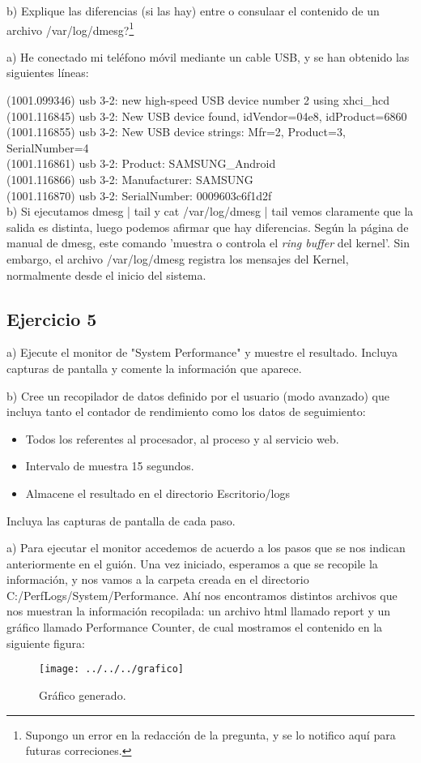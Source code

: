 \documentclass[a4paper, 11pt]{article} %
\begin{document}
b) Explique las diferencias (si las hay) entre o consulaar el contenido de un archivo /var/log/dmesg?\footnote{Supongo un error en la redacción de la pregunta, y se lo notifico aquí para futuras correciones.}


a) He conectado mi teléfono móvil mediante un cable USB, y se han obtenido las siguientes líneas: 

(1001.099346) usb 3-2: new high-speed USB device number 2 using xhci\_hcd\\
(1001.116845) usb 3-2: New USB device found, idVendor=04e8, idProduct=6860\\
(1001.116855) usb 3-2: New USB device strings: Mfr=2, Product=3, SerialNumber=4\\
(1001.116861) usb 3-2: Product: SAMSUNG\_Android\\
(1001.116866) usb 3-2: Manufacturer: SAMSUNG\\
(1001.116870) usb 3-2: SerialNumber: 0009603c6f1d2f\\


b) Si ejecutamos dmesg | tail y cat /var/log/dmesg | tail vemos claramente que la salida es distinta, luego podemos afirmar que hay diferencias. Según la página de manual de dmesg, este comando 'muestra o controla el \textit{ring buffer} del kernel'. Sin embargo, el archivo /var/log/dmesg registra los mensajes del Kernel, normalmente desde el inicio del sistema.

\subsection{Ejercicio 5}
a) Ejecute el monitor de "System Performance" y muestre el resultado. Incluya capturas de pantalla y comente la información que aparece. 

b) Cree un recopilador de datos definido por el usuario (modo avanzado) que incluya tanto el contador de rendimiento como los datos de seguimiento: 
\begin{itemize}
\item Todos los referentes al procesador, al proceso y al servicio web. 
\item Intervalo de muestra 15 segundos.
\item Almacene el resultado en el directorio Escritorio/logs
\end{itemize}
Incluya las capturas de pantalla de cada paso. 

a) Para ejecutar el monitor accedemos de acuerdo a los pasos que se nos indican anteriormente en el guión. Una vez iniciado, esperamos a que se recopile la información, y nos vamos a la carpeta creada en el directorio C:/PerfLogs/System/Performance. Ahí nos encontramos distintos archivos que nos muestran la información recopilada: un archivo html llamado report y un gráfico llamado Performance Counter, de cual mostramos el contenido en la siguiente figura: 
\pagebreak
\begin{figure}[htpb]
\centering
\texttt{[image: ../../../grafico]}
\caption{Gráfico generado.}
\end{figure}
\end{document}
